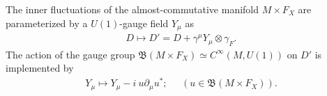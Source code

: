 \begin{myproposition}
    The inner fluctuations of the almost-commutative manifold $M\times
    F_X$ are parameterized by a $U(1)$-gauge field $Y_\mu$ as
    \begin{align}
        D \mapsto D' = D + \gamma ^\mu Y_\mu \otimes \gamma_F.
    \end{align}
    The action of the gauge group $\mathfrak{B}(M\times F_X) \simeq
    C^\infty (M, U(1))$ on $D'$ is implemented by
    \begin{align}
        Y_\mu \mapsto Y_\mu - i\ u\partial_\mu u^*; \;\;\;\;\; (u\in
        \mathfrak{B}(M\times F_X)).
    \end{align}
\end{myproposition}

